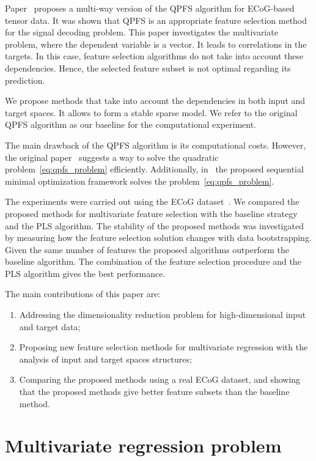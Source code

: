 \documentclass[preprint,authoryear,12pt]{elsarticle}
\theoremstyle{definition}
\begin{document}
Paper~\citep{motrenko2018multi} proposes a multi-way version of the QPFS algorithm for ECoG-based tensor data. 
It was shown that QPFS is an appropriate feature selection method for the signal decoding problem.
This paper investigates the multivariate problem, where the dependent variable is a vector. 
It leads to correlations in the targets. 
In this case, feature selection algorithms do not take into account these dependencies.
Hence, the selected feature subset is not optimal regarding its prediction.

We propose methods that take into account the dependencies in both input and target spaces. 
It allows to form a stable sparse model.
We refer to the original QPFS algorithm as our baseline for the computational experiment.

The main drawback of the QPFS algorithm is its computational costs. However, the original paper~\citep{rodriguez2010quadratic} suggests a way to solve the quadratic problem~\eqref{eq:qpfs_problem} efficiently. Additionally, in~\citep{prasad2013scaling} the proposed sequential minimal optimization framework solves the problem~\eqref{eq:qpfs_problem}.

The experiments were carried out using the ECoG dataset~\citep{shimoda2012decoding}.
We compared the proposed methods for multivariate feature selection with the baseline strategy and the PLS algorithm. 
The stability of the proposed methods was investigated by measuring how the feature selection solution changes with data bootstrapping.
Given the same number of features the proposed algorithms outperform the baseline algorithm. 
The combination of the feature selection procedure and the PLS algorithm gives the best performance.

The main contributions of this paper are:
\begin{enumerate}
	\item Addressing the dimensionality reduction problem for high-dimensional input and target data;
	\item Proposing new feature selection methods for multivariate regression with the analysis of input and target spaces structures;
	\item Comparing the proposed methods using a real ECoG dataset, and showing that the proposed methods give better feature subsets than the baseline method.
\end{enumerate}


\section{Multivariate regression problem}
\end{document}
